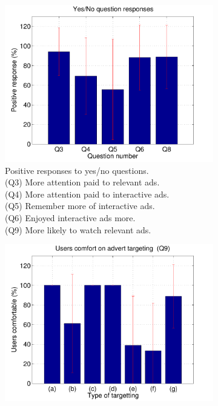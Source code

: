 	\begin{figure}[!ht]
		\centering
		\begin{subfigure}[t]{0.49\textwidth}
			\centering
			\includegraphics[width=\textwidth]{images/yesno_results.pdf}
			\caption{Positive responses to yes/no questions. \\
				(Q3) More attention paid to relevant ads. \\
				(Q4) More attention paid to interactive ads. \\
				(Q5) Remember more of interactive ads. \\
				(Q6) Enjoyed interactive ads more. \\
				(Q9) More likely to watch relevant ads.
			}
			\label{fig:yesno_results}
		\end{subfigure}
		\begin{subfigure}[t]{0.49\textwidth}
			\centering
			\includegraphics[width=\textwidth]{images/targeting.pdf}

\end{subfigure}
\end{figure}
